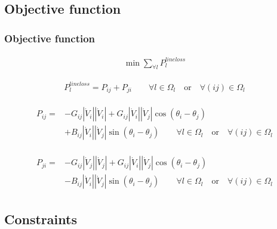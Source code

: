\documentclass[
	11pt, %
	aspectratio=169, %
]{beamer}
\begin{document}


\subsection{Objective function}

\begin{frame}
	\frametitle{Objective function}
	\begin{align}
		\min{ \sum_{\forall l} {P_{l}^{line loss}} }
	\end{align}

	\begin{align}
		P_{l}^{line loss} = P_{ij} + P_{ji} \quad \quad \forall l \in \Omega_{l} \quad \text{or} \quad \forall (ij) \in \Omega_{l}
	\end{align}

	\begin{align}
		\begin{split}
		P_{ij} = &-G_{ij} \left|\dot{V}_{i} \right| \left|\dot{V}_{i} \right| 
		+ G_{ij} \left|\dot{V}_{i} \right| \left|\dot{V}_{j} \right| \cos\left(\theta_{i}-\theta_{j} \right) \\
		&+ B_{ij} \left|\dot{V}_{i} \right| \left|\dot{V}_{j} \right| \sin\left(\theta_{i}-\theta_{j} \right) 
		\quad \quad \forall l \in \Omega_{l} \quad \text{or} \quad \forall (ij) \in \Omega_{l}
		\end{split}
	\end{align}

	\begin{align}
		\begin{split}
		P_{ji}=&-G_{ij} \left|\dot{V}_{j} \right| \left|\dot{V}_{j} \right| 
		+ G_{ij} \left|\dot{V}_{i} \right| \left|\dot{V}_{j} \right| \cos\left(\theta_{i}-\theta_{j} \right)\\
		&- B_{ij} \left|\dot{V}_{i} \right| \left|\dot{V}_{j} \right| \sin\left(\theta_{i}-\theta_{j} \right)
		\quad \quad \forall l \in \Omega_{l} \quad \text{or} \quad \forall (ij) \in \Omega_{l}
		\end{split}
	\end{align}


\end{frame}


\subsection{Constraints}
\end{document}
